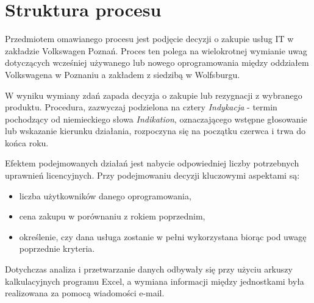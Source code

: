 \section{Struktura procesu}
Przedmiotem omawianego procesu jest podjęcie decyzji o zakupie usług IT w zakładzie Volkswagen Poznań. Proces ten polega na wielokrotnej wymianie uwag dotyczących wcześniej używanego lub nowego oprogramowania między oddziałem Volkswagena w Poznaniu a zakładem z siedzibą w Wolfsburgu.

W wyniku wymiany zdań zapada decyzja o zakupie lub rezygnacji z wybranego produktu. Procedura, zazwyczaj podzielona na cztery {\emph{Indykacja} - termin pochodzący od niemieckiego słowa \emph{Indikation}, oznaczającego wstępne głosowanie lub wskazanie kierunku działania}, rozpoczyna się na początku czerwca i trwa do końca roku.

Efektem podejmowanych działań jest nabycie odpowiedniej liczby potrzebnych uprawnień licencyjnych. Przy
podejmowaniu decyzji kluczowymi aspektami są:
\begin{itemize}
    \item liczba użytkowników danego oprogramowania,
    \item cena zakupu w porównaniu z rokiem poprzednim,
    \item określenie, czy dana usługa zostanie w pełni wykorzystana biorąc pod uwagę poprzednie kryteria.
\end{itemize}
Dotychczas analiza i przetwarzanie danych odbywały się przy użyciu arkuszy kalkulacyjnych programu Excel, a wymiana informacji między jednostkami była realizowana za pomocą wiadomości e-mail.
